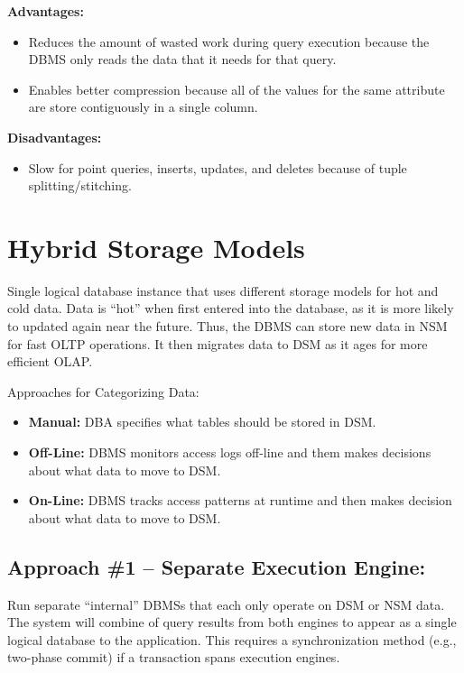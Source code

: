 \documentclass[11pt]{article}
\begin{document}
\textbf{Advantages:}
\begin{itemize}
    \item
    Reduces the amount of wasted work during query execution because the DBMS only reads the data 
    that it needs for that query.
    
    \item
    Enables better compression because all of the values for the same attribute are store 
    contiguously in a single column.
\end{itemize}

\textbf{Disadvantages:}
\begin{itemize}
    \item
    Slow for point queries, inserts, updates, and deletes because of tuple 
    splitting/stitching.
\end{itemize}

\section{Hybrid Storage Models}
Single logical database instance that uses different storage models for hot and cold 
data. Data is ``hot'' when first entered into the database, as it is more likely to updated 
again near the future. Thus, the DBMS can store new data in NSM for fast OLTP operations. It then 
migrates data to DSM as it ages for more efficient OLAP.

Approaches for Categorizing Data:
\begin{itemize}
    \item \textbf{Manual:}
    DBA specifies what tables should be stored in DSM.
    
    \item \textbf{Off-Line:}
    DBMS monitors access logs off-line and them makes decisions about what 
    data to move to DSM.
    
    \item \textbf{On-Line:}
    DBMS tracks access patterns at runtime and then makes decision about what data to move to DSM.
\end{itemize}

\subsection*{Approach \#1 -- Separate Execution Engine:}
Run separate ``internal'' DBMSs that each only operate on DSM or NSM data.
The system will combine of query results from both engines to appear as a single 
logical database to the application.
This requires a synchronization method (e.g., two-phase commit) if a transaction spans execution 
engines.
\end{document}
